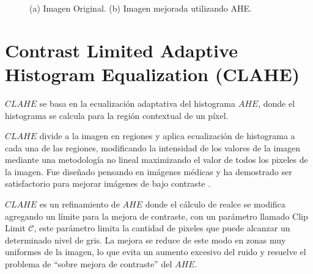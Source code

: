 \begin{figure}[H]
  \begin{center}
   \captionsetup[figure]{labelformat=empty}
    \caption{(a) Imagen Original. (b) Imagen mejorada utilizando AHE.}
    \label{cameramanAHE}
  \end{center}
\end{figure}


\section{Contrast Limited Adaptive Histogram Equalization (CLAHE)}

$CLAHE$ \cite{Zuiderveld1994} se basa en la ecualización adaptativa del histograma $AHE$, donde el histograma se calcula para la región contextual de un píxel.

$CLAHE$ divide a la imagen en regiones y aplica ecualización de histograma a cada una de las regiones, modificando la intensidad de los valores de la imagen mediante una metodología no lineal maximizando el valor de todos los pixeles de la imagen. Fue diseñado pensando en imágenes médicas y ha demostrado ser satisfactorio para mejorar imágenes de bajo contraste \cite{SMG11,MR13}.

$CLAHE$ es un refinamiento de $AHE$ donde el cálculo de realce se modifica agregando un límite para la mejora de contraste, con un parámetro llamado Clip Limit $\mathscr{C}$, este parámetro limita la cantidad de pixeles que puede alcanzar un determinado nivel de gris. La mejora se reduce de este modo en zonas muy uniformes de la imagen, lo que evita un aumento excesivo del ruido y resuelve el problema de “sobre mejora de contraste” del $AHE$.

